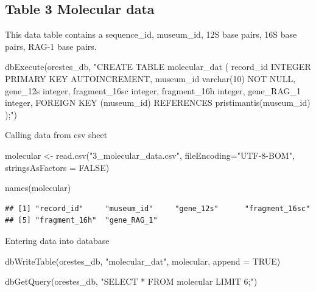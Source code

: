 \documentclass[
]{book}
\newenvironment{Shaded}{\begin{snugshade}}{\end{snugshade}}
\newcommand{\AttributeTok}[1]{\textcolor[rgb]{0.77,0.63,0.00}{#1}}
\newcommand{\ConstantTok}[1]{\textcolor[rgb]{0.00,0.00,0.00}{#1}}
\newcommand{\FunctionTok}[1]{\textcolor[rgb]{0.00,0.00,0.00}{#1}}
\newcommand{\NormalTok}[1]{#1}
\newcommand{\OtherTok}[1]{\textcolor[rgb]{0.56,0.35,0.01}{#1}}
\newcommand{\StringTok}[1]{\textcolor[rgb]{0.31,0.60,0.02}{#1}}
\begin{document}
\hypertarget{table-3-molecular-data}{%
\subsection{Table 3 Molecular data}\label{table-3-molecular-data}}

This data table contains a sequence\_id, museum\_id, 12S base pairs, 16S base pairs, RAG-1 base pairs.

\begin{Shaded}
\begin{Highlighting}[]
\FunctionTok{dbExecute}\NormalTok{(orestes\_db, }\StringTok{"CREATE TABLE molecular\_dat (}
\StringTok{record\_id INTEGER PRIMARY KEY AUTOINCREMENT,}
\StringTok{museum\_id varchar(10) NOT NULL,}
\StringTok{gene\_12s integer,}
\StringTok{fragment\_16sc integer,}
\StringTok{fragment\_16h integer,}
\StringTok{gene\_RAG\_1 integer,}
\StringTok{FOREIGN KEY (museum\_id) REFERENCES pristimantis(museum\_id)}
\StringTok{);"}\NormalTok{)}
\end{Highlighting}
\end{Shaded}

Calling data from csv sheet

\begin{Shaded}
\begin{Highlighting}[]
\NormalTok{molecular }\OtherTok{\textless{}{-}} \FunctionTok{read.csv}\NormalTok{(}\StringTok{"3\_molecular\_data.csv"}\NormalTok{, }\AttributeTok{fileEncoding=}\StringTok{"UTF{-}8{-}BOM"}\NormalTok{, }
                   \AttributeTok{stringsAsFactors =} \ConstantTok{FALSE}\NormalTok{) }

\FunctionTok{names}\NormalTok{(molecular)}
\end{Highlighting}
\end{Shaded}

\begin{verbatim}
## [1] "record_id"     "museum_id"     "gene_12s"      "fragment_16sc"
## [5] "fragment_16h"  "gene_RAG_1"
\end{verbatim}

Entering data into database

\begin{Shaded}
\begin{Highlighting}[]
\FunctionTok{dbWriteTable}\NormalTok{(orestes\_db, }\StringTok{"molecular\_dat"}\NormalTok{, molecular, }\AttributeTok{append =} \ConstantTok{TRUE}\NormalTok{)}

\FunctionTok{dbGetQuery}\NormalTok{(orestes\_db, }\StringTok{"SELECT * FROM molecular LIMIT 6;"}\NormalTok{)}
\end{Highlighting}
\end{Shaded}
\end{document}
